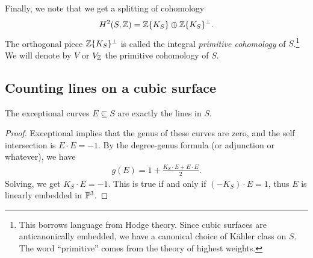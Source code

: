 \documentclass[11pt]{amsart}
\begin{document}
Finally, we note that we get a splitting of cohomology
\begin{align*}
    H^2(S,\Z) = \Z\{K_S\} \oplus \Z\{K_S\}^\perp.
\end{align*}
The orthogonal piece $\Z\{K_S\}^\perp$ is called the integral \textit{primitive cohomology} of $S$.\footnote{This borrows language from Hodge theory. Since cubic surfaces are anticanonically embedded, we have a canonical choice of K\"{a}hler class on $S$. The word ``primitive'' comes from the theory of highest weights.} We will denote by $V$ or $V_\Z$ the primitive cohomology of $S$.

\subsection{Counting lines on a cubic surface}

\begin{proposition} The exceptional curves $E \subseteq S$ are exactly the lines in $S$.
\end{proposition}
\begin{proof} Exceptional implies that the genus of these curves are zero, and the self intersection is $E\cdot E = -1$. By the degree-genus formula (or adjunction or whatever), we have
\begin{align*}
    g(E) = 1 + \frac{K_S\cdot E + E\cdot E}{2}.
\end{align*}
Solving, we get $K_S\cdot E = -1$. This is true if and only if $(-K_S)\cdot E =1$, thus $E$ is linearly embedded in $\P^3$.
\end{proof}
\end{document}
